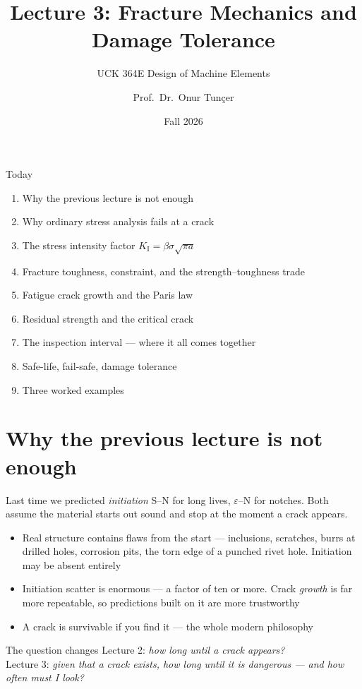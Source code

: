 \documentclass[aspectratio=169,10pt]{beamer}
\title{Lecture 3: Fracture Mechanics and Damage Tolerance}
\subtitle{UCK 364E Design of Machine Elements}
\author{Prof.\ Dr.\ Onur Tunçer}
\institute{Department of Aeronautical Engineering, Istanbul Technical University}
\date{Fall 2026}
\begin{document}
\maketitle

\begin{frame}{Today}
\begin{enumerate}
  \item Why the previous lecture is not enough
  \item Why ordinary stress analysis fails at a crack
  \item The stress intensity factor $K_{\mathrm I}=\beta\sigma\sqrt{\pi a}$
  \item Fracture toughness, constraint, and the strength--toughness trade
  \item Fatigue crack growth and the Paris law
  \item Residual strength and the critical crack
  \item The inspection interval --- where it all comes together
  \item Safe-life, fail-safe, damage tolerance
  \item Three worked examples
\end{enumerate}
\end{frame}

\section{Why the previous lecture is not enough}

\begin{frame}{Last time we predicted \emph{initiation}}
S--N for long lives, $\varepsilon$--N for notches. Both assume the material starts out sound and stop at the moment a crack appears.
\vspace{4pt}
\begin{itemize}
  \item \alert{Real structure contains flaws from the start} --- inclusions, scratches, burrs at drilled holes, corrosion pits, the torn edge of a punched rivet hole. Initiation may be absent entirely
  \item \alert{Initiation scatter is enormous} --- a factor of ten or more. Crack \emph{growth} is far more repeatable, so predictions built on it are more trustworthy
  \item \alert{A crack is survivable if you find it} --- the whole modern philosophy
\end{itemize}
\begin{alertblock}{The question changes}
Lecture 2: \emph{how long until a crack appears?}\\
Lecture 3: \emph{given that a crack exists, how long until it is dangerous --- and how often must I look?}
\end{alertblock}
\end{frame}
\end{document}
